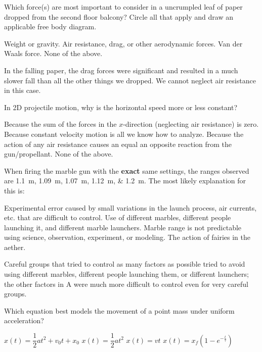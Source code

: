 \documentclass[exam,addpoints, answers]{exam}
\begin{document}
\begin{questions}
\question[1] Which force(s) are most important to consider in a uncrumpled leaf of paper dropped from the second floor balcony? Circle all that apply and draw an applicable free body diagram. 
\begin{choices}
\CorrectChoice Weight or gravity. 
\CorrectChoice Air resistance, drag, or other aerodynamic forces. 
\choice Van der Waals force. 
\choice None of the above.
\end{choices}
\begin{solution}
In the falling paper, the drag forces were significant and resulted in a much slower fall than all the other things we dropped. We cannot neglect air resistance in this case. 
\end{solution}

\question[1] In 2D projectile motion, why is the horizontal speed more or less constant?
\begin{choices}
\CorrectChoice Because the sum of the forces in the $x$-direction (neglecting air resistance) is zero. 
\choice Because constant velocity motion is all we know how to analyze. 
\choice Because the action of any air resistance causes an equal an opposite reaction from the gun/propellant. 
\choice None of the above. 
\end{choices}

\question[1] When firing the marble gun with the \textbf{exact} same settings, the ranges observed are \SIlist{1.1; 1.09; 1.07; 1.12; 1.2}{\meter}. The most likely explanation for this is: 
\begin{choices}
\CorrectChoice Experimental error caused by small variations in the launch process, air currents, etc. that are difficult to control.  
\choice Use of different marbles, different people launching it, and different marble launchers. 
\choice Marble range is not predictable using science, observation, experiment, or modeling. 
\choice The action of fairies in the aether. 
\end{choices}
\begin{solution}
Careful groups that tried to control as many factors as possible tried to avoid using different marbles, different people launching them, or different launchers; the other factors in A were much more difficult to control even for very careful groups. 
\end{solution}

\question[1] Which equation best models the movement of a point mass under uniform acceleration?
\begin{choices}
\CorrectChoice $x(t) = \dfrac{1}{2} a t^2 + v_0 t + x_0$
\choice $x(t) = \dfrac{1}{2} a t^2$
\choice $x(t) = v t$
\choice $x(t) = x_f \left( 1 - e^{-\frac{t}{\tau}} \right)$
\end{choices}







\end{questions}
\end{document}
